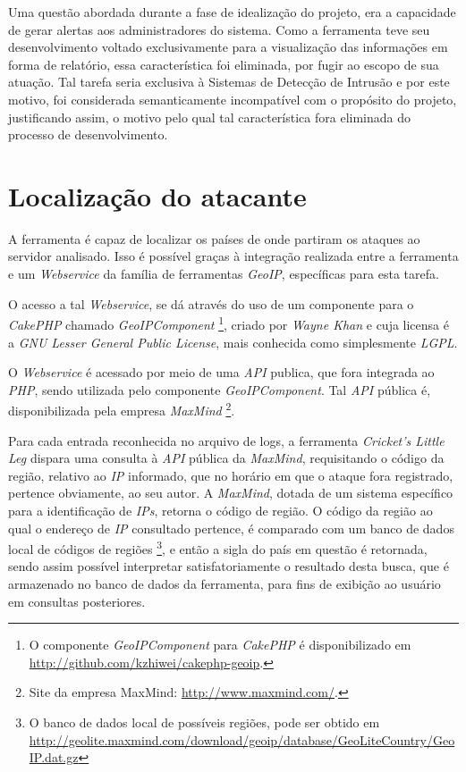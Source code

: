 Uma questão abordada durante a fase de idealização do projeto, era a capacidade de gerar alertas aos administradores do sistema. Como a ferramenta teve seu desenvolvimento voltado exclusivamente para a visualização das informações em forma de relatório, essa característica foi eliminada, por fugir ao escopo de sua atuação. Tal tarefa seria exclusiva à Sistemas de Detecção de Intrusão e por este motivo, foi considerada semanticamente incompatível com o propósito do projeto, justificando assim, o motivo pelo qual tal característica fora eliminada do processo de desenvolvimento.

\section{Localização do atacante}

A ferramenta é capaz de localizar os países de onde partiram os ataques ao servidor analisado. Isso é possível graças à integração realizada entre a ferramenta e um \textit{Webservice} da família de ferramentas \textit{GeoIP}, específicas para esta tarefa.

O acesso a tal \textit{Webservice}, se dá através do uso de um componente para o \textit{CakePHP} chamado \textit{GeoIPComponent} \footnote{O componente \textit{GeoIPComponent} para \textit{CakePHP} é disponibilizado em \url{http://github.com/kzhiwei/cakephp-geoip}.}, criado por \textit{Wayne Khan} e cuja licensa é a \textit{GNU Lesser General Public License}, mais conhecida como simplesmente \textit{LGPL}.

O \textit{Webservice} é acessado por meio de uma \textit{API} publica, que fora integrada ao \textit{PHP}, sendo utilizada pelo componente \textit{GeoIPComponent}. Tal \textit{API} pública é, disponibilizada pela empresa \textit{MaxMind} \footnote{Site da empresa MaxMind: \url{http://www.maxmind.com/}.}.

Para cada entrada reconhecida no arquivo de logs, a ferramenta \textit{Cricket's Little Leg} dispara uma consulta à \textit{API} pública da \textit{MaxMind}, requisitando o código da região, relativo ao \textit{IP} informado, que no horário em que o ataque fora registrado, pertence obviamente, ao seu autor. A \textit{MaxMind}, dotada de um sistema específico para a identificação de \textit{IPs}, retorna o código de região. O código da região ao qual o endereço de \textit{IP} consultado pertence, é comparado com um banco de dados local de códigos de regiões \footnote{O banco de dados local de possíveis regiões, pode ser obtido em \url{http://geolite.maxmind.com/download/geoip/database/GeoLiteCountry/GeoIP.dat.gz}}, e então a sigla do país em questão é retornada, sendo assim possível interpretar satisfatoriamente o resultado desta busca, que é armazenado no banco de dados da ferramenta, para fins de exibição ao usuário em consultas posteriores.

